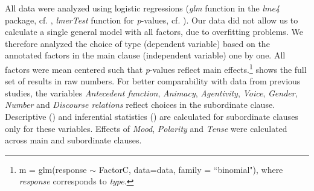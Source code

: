\documentclass[output=paper,colorlinks,citecolor=brown]{langscibook}
\begin{document}
All data were analyzed using logistic regressions (\textit{glm} function in the \textit{lme4} package, cf. \citealt{bates2015package}, \textit{lmerTest} function for \textit{p}-values, cf. \citealt{kuznetsova2017lmertest}). Our data did not allow us to calculate a single general model with all factors, due to overfitting problems. We therefore analyzed the choice of   type (dependent variable) based on the annotated factors in the main clause (independent variable) one by one. All factors were mean centered such that \textit{p}-values reflect main effects.\footnote{m = glm(response $\sim$ 
 FactorC, data=data, family = ``binomial"), where \textit{response} corresponds to \textit{ type}.} 
 shows the full set of results in raw numbers. For better comparability with data from previous studies, the variables \textit{Antecedent function}, \textit{Animacy}, \textit{Agentivity}, \textit{Voice}, \textit{Gender}, \textit{Number} and \textit{Discourse relations} reflect  choices in the subordinate clause. Descriptive () and inferential statistics () are calculated for subordinate clauses only for these variables. Effects of 
\textit{Mood}, \textit{Polarity} and \textit{Tense} were calculated across main and subordinate clauses.
\end{document}
